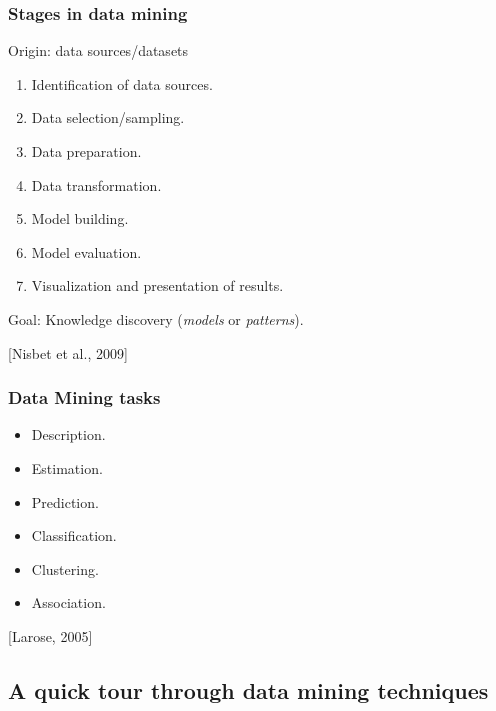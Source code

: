 
\begin{frame}
\frametitle{Stages in data mining}

Origin: data sources/datasets

\begin{enumerate}
 \item Identification of data sources.
 \item Data selection/sampling.
 \item Data preparation.
 \item Data transformation.
 \item Model building.
 \item Model evaluation.
 \item Visualization and presentation of results.
\end{enumerate}

Goal: Knowledge discovery (\textit{models} or \textit{patterns}).

\begin{flushright}
{\small [Nisbet et al., 2009]}
\end{flushright}

\end{frame}


\begin{frame}
\frametitle{Data Mining tasks}

\begin{itemize}
 \item Description.
 \item Estimation.
 \item Prediction.
 \item Classification.
 \item Clustering.
 \item Association.
\end{itemize}

\begin{flushright}
{\small [Larose, 2005]}
\end{flushright}

\end{frame}

\subsection{A quick tour through data mining techniques}

